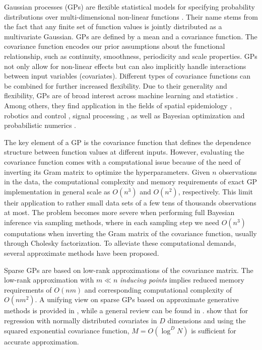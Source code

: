\documentclass[onecolumn,a4paper,11pt]{article}
\begin{document}
Gaussian processes (GPs) are flexible statistical models for specifying probability distributions over multi-dimensional non-linear functions \citep{rasmussen2006gaussian,neal1997monte}. Their name stems from the fact that any finite set of function values is jointly distributed as a multivariate Gaussian. GPs are defined by a mean and a covariance function. The covariance function encodes our prior assumptions about the functional relationship, such as continuity, smoothness, periodicity and scale properties. GPs not only allow for non-linear effects but can also implicitly handle interactions between input variables (covariates). Different types of covariance functions can be combined for further increased flexibility. Due to their generality and flexibility, GPs are of broad interest across machine learning and statistics \citep{rasmussen2006gaussian,neal1997monte}. Among others, they find application in the fields of spatial epidemiology \citep{diggle2013statistical,carlin2014hierarchical}, robotics and control \citep{deisenroth2015gaussian}, signal processing \citep{sarkka2013spatiotemporal}, as well as Bayesian optimization and probabilistic numerics \citep{roberts2010bayesian,briol2015probabilistic,hennig2015probabilistic}.

The key element of a GP is the covariance function that defines the dependence structure between function values at different inputs. However, evaluating the covariance function comes with a computational issue because of the need of inverting its Gram matrix to optimize the hyperparameters. Given $n$ observations in the data, the computational complexity and memory requirements of exact GP implementation in general scale as $O(n^3)$ and $O(n^2)$, respectively. This limit their application to rather small data sets of a few tens of thousands observations at most. The problem becomes more severe when performing full Bayesian inference via sampling methods, where in each sampling step we need $O(n^3)$ computations when inverting the Gram matrix of the covariance function, usually through Cholesky factorization. To alleviate these computational demands, several approximate methods have been proposed. 

Sparse GPs are based on low-rank approximations of the covariance matrix. The low-rank approximation with $m \ll n$ {\it inducing points} implies reduced memory requirements of $O(nm)$ and corresponding computational complexity of $O(nm^2)$.
A unifying view on sparse GPs based on approximate generative methods
is provided in \cite{quinonero2005unifying}, while a general review
can be found in \cite{rasmussen2006gaussian}. \citet{Burt+Rasmussen+vanderWilk:2019} show that for regression with normally distributed covariates in $D$ dimensions and using the squared exponential covariance function, $M=O(\log^DN)$ is sufficient for accurate approximation.
\end{document}
